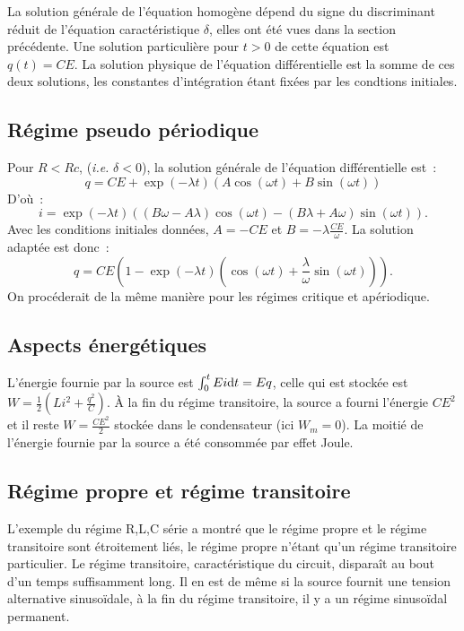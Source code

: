 La solution générale de l'équation homogène dépend du signe du discriminant réduit de l'équation caractéristique \(\delta\), elles ont été vues dans la section précédente. Une solution particulière pour \(t>0\) de cette équation est \(q(t)=CE\). La solution physique de l'équation différentielle est la somme de ces deux solutions, les constantes d'intégration étant fixées par les condtions initiales.
\subsection{Régime pseudo périodique}
Pour \(R<Rc\), (\emph{i.e.} \(\delta<0\)), la solution générale de l'équation différentielle est~:
\begin{equation}
  q = CE + \exp(-\lambda t)(A\cos(\omega t) + B\sin(\omega t))
\end{equation}
D'où~:
\begin{equation}
  i = \exp(-\lambda t)((B\omega-A\lambda)\cos(\omega t) - (B \lambda+A \omega)\sin(\omega t)).
\end{equation}
Avec les conditions initiales données, \(A=-CE\) et \(B=-\lambda \frac{CE}{\omega}\). La solution adaptée est donc~:
\begin{equation}
  q = CE\left(1 - \exp(-\lambda t) \left(\cos(\omega t) + \frac{\lambda}{\omega} \sin(\omega t) \right)\right).
\end{equation}
On procéderait de la même manière pour les régimes critique et apériodique.
\subsection{Aspects énergétiques}
L'énergie fournie par la source est \(\int_0^t E i \mathrm{d} t = Eq\), celle qui est stockée est \(W = \frac{1}{2} \left(Li^2 + \frac{q^2}{C}\right)\). À la fin du régime transitoire, la source a fourni l'énergie \(CE^2\) et il reste \(W=\frac{CE^2}{2}\) stockée dans le condensateur (ici \(W_m=0\)). La moitié de l'énergie fournie par la source a été consommée par effet Joule.
\subsection{Régime propre et régime transitoire}
L'exemple du régime R,L,C série a montré que le régime propre et le régime transitoire sont étroitement liés, le régime propre n'étant qu'un régime transitoire particulier. Le régime transitoire, caractéristique du circuit, disparaît au bout d'un temps suffisamment long. Il en est de même si la source fournit une tension alternative sinusoïdale, à la fin du régime transitoire, il y a un régime sinusoïdal permanent.
